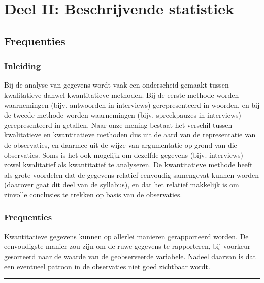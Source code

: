 \documentclass[
]{book}
\begin{document}
\hypertarget{part-deel-ii-beschrijvende-statistiek}{%
\part*{Deel II: Beschrijvende statistiek}\label{part-deel-ii-beschrijvende-statistiek}}

\hypertarget{ch:frequenties}{%
\chapter{Frequenties}\label{ch:frequenties}}

\hypertarget{inleiding-3}{%
\section{Inleiding}\label{inleiding-3}}

Bij de analyse van gegevens wordt vaak een onderscheid gemaakt tussen
kwalitatieve danwel kwantitatieve methoden. Bij de eerste methode worden
waarnemingen (bijv. antwoorden in interviews) gerepresenteerd in
woorden, en bij de tweede methode worden waarnemingen (bijv.
spreekpauzes in interviews) gerepresenteerd in getallen. Naar onze
mening bestaat het verschil tussen kwalitatieve en kwantitatieve
methoden dus uit de aard van de representatie van de observaties, en
daarmee uit de wijze van argumentatie op grond van die observaties. Soms
is het ook mogelijk om dezelfde gegevens (bijv. interviews) zowel
kwalitatief als kwantitatief te analyseren. De kwantitatieve methode
heeft als grote voordelen dat de gegevens relatief eenvoudig samengevat
kunnen worden (daarover gaat dit deel van de syllabus), en dat het
relatief makkelijk is om zinvolle conclusies te trekken op basis van de
observaties.

\hypertarget{sec:frequenties}{%
\section{Frequenties}\label{sec:frequenties}}

Kwantitatieve gegevens kunnen op allerlei manieren gerapporteerd worden.
De eenvoudigste manier zou zijn om de ruwe gegevens te rapporteren, bij
voorkeur gesorteerd naar de waarde van de geobserveerde variabele.
Nadeel daarvan is dat een eventueel patroon in de observaties niet goed
zichtbaar wordt.

\begin{center}\rule{0.5\linewidth}{0.5pt}\end{center}
\end{document}
